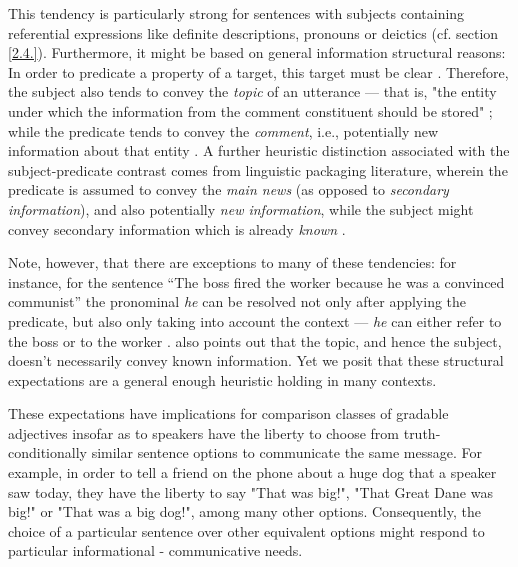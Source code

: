 This tendency is particularly strong for sentences with subjects containing referential expressions like definite descriptions, pronouns or deictics (cf. section \ref{2.4.}). Furthermore, it might be based on general information structural reasons: In order to predicate a property of a target, this target must be clear \parencite{searle1969speech, krifka2008basic}. Therefore, the subject also tends to convey the \textit{topic} of an utterance --- that is, "the entity under which the information from the comment constituent should be stored" \parencite[p.X]{krifka2008basic}; while the predicate tends to convey the \textit{comment},  i.e., potentially new information about that entity \parencite{krifka2008basic, chafe1976givenness, Reboul2001}. A further heuristic distinction associated with the subject-predicate contrast comes from linguistic packaging literature, wherein the predicate is assumed to convey the \textit{main news} (as opposed to \textit{secondary information}), and also potentially \textit{new information}, while the subject might convey secondary information which is already \textit{known} \parencite{kaiser2020}. 

Note, however, that there are exceptions to many of these tendencies: for instance, for the sentence “The boss fired the worker because he was a convinced communist” the pronominal \emph{he} can be resolved not only after applying the predicate, but also only taking into account the context --- \emph{he} can either refer to the boss or to the worker \parencite{Reboul2001}. \textcite{krifka2008basic} also points out that the topic, and hence the subject,  doesn't necessarily convey known information.
Yet we posit that these structural expectations are a general enough heuristic holding in many contexts.

These expectations have implications for comparison classes of gradable adjectives insofar as to speakers have the liberty to choose from truth-conditionally similar sentence options to communicate the same message. For example, in order to tell a friend on the phone about a huge dog that a speaker saw today, they have the liberty to say "That was big!", "That Great Dane was big!" or "That was a big dog!", among many other options. Consequently, the choice of a particular sentence over other equivalent options might respond to particular informational - communicative needs. 

